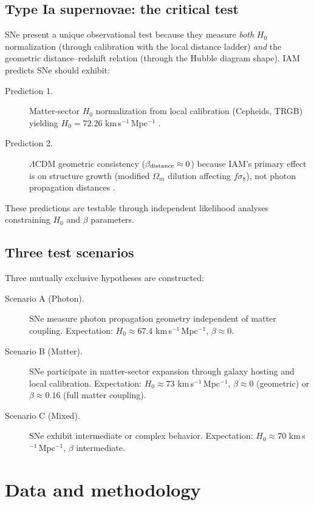 \subsection{Type Ia supernovae: the critical test}
SNe present a unique observational test because they measure \emph{both} $H_0$ normalization (through calibration with the local distance ladder)
\emph{and} the geometric distance--redshift relation (through the Hubble diagram shape). IAM predicts SNe should exhibit:
\begin{description}
\item[Prediction 1.] Matter-sector $H_0$ normalization from local calibration (Cepheids, TRGB) yielding $H_0=72.26$ km\,s$^{-1}$\,Mpc$^{-1}$ \prediction.
\item[Prediction 2.] $\Lambda$CDM geometric consistency ($\beta_{\rm distance}\approx0$) because IAM's primary effect is on structure growth (modified
$\Omega_m$ dilution affecting $f\sigma_8$), not photon propagation distances \prediction.
\end{description}
These predictions are testable through independent likelihood analyses constraining $H_0$ and $\beta$ parameters.

\subsection{Three test scenarios}
Three mutually exclusive hypotheses are constructed:
\begin{description}
\item[Scenario A (Photon).] SNe measure photon propagation geometry independent of matter coupling. Expectation: $H_0\approx67.4$ km\,s$^{-1}$\,Mpc$^{-1}$,
$\beta\approx0$.
\item[Scenario B (Matter).] SNe participate in matter-sector expansion through galaxy hosting and local calibration. Expectation: $H_0\approx73$
km\,s$^{-1}$\,Mpc$^{-1}$, $\beta\approx0$ (geometric) or $\beta\approx0.16$ (full matter coupling).
\item[Scenario C (Mixed).] SNe exhibit intermediate or complex behavior. Expectation: $H_0\approx70$ km\,s$^{-1}$\,Mpc$^{-1}$, $\beta$ intermediate.
\end{description}

\section{Data and methodology}\label{sec:dsv_data}
